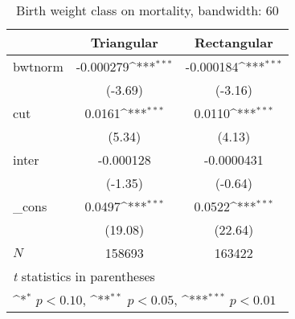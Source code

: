 \begin{table}[htbp]\centering
\def\sym#1{\ifmmode^{#1}\else\(^{#1}\)\fi}
\caption{Birth weight class on mortality, bandwidth: 60}
\begin{tabular}{l*{2}{c}}
\hline\hline
            &\multicolumn{1}{c}{Triangular}&\multicolumn{1}{c}{Rectangular}\\
\hline
bwtnorm     &   -0.000279\sym{***}&   -0.000184\sym{***}\\
            &     (-3.69)         &     (-3.16)         \\
[1em]
cut         &      0.0161\sym{***}&      0.0110\sym{***}\\
            &      (5.34)         &      (4.13)         \\
[1em]
inter       &   -0.000128         &  -0.0000431         \\
            &     (-1.35)         &     (-0.64)         \\
[1em]
\_cons      &      0.0497\sym{***}&      0.0522\sym{***}\\
            &     (19.08)         &     (22.64)         \\
\hline
\(N\)       &      158693         &      163422         \\
\hline\hline
\multicolumn{3}{l}{\footnotesize \textit{t} statistics in parentheses}\\
\multicolumn{3}{l}{\footnotesize \sym{*} \(p<0.10\), \sym{**} \(p<0.05\), \sym{***} \(p<0.01\)}\\
\end{tabular}
\end{table}

